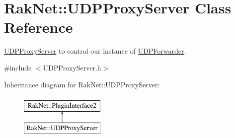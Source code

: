\hypertarget{class_rak_net_1_1_u_d_p_proxy_server}{\section{Rak\-Net\-:\-:U\-D\-P\-Proxy\-Server Class Reference}
\label{class_rak_net_1_1_u_d_p_proxy_server}
}


\hyperlink{class_rak_net_1_1_u_d_p_proxy_server}{U\-D\-P\-Proxy\-Server} to control our instance of \hyperlink{class_rak_net_1_1_u_d_p_forwarder}{U\-D\-P\-Forwarder}.  




{\ttfamily \#include $<$U\-D\-P\-Proxy\-Server.\-h$>$}

Inheritance diagram for Rak\-Net\-:\-:U\-D\-P\-Proxy\-Server\-:\begin{figure}[H]
\begin{center}
\leavevmode
\includegraphics[height=2.000000cm]{class_rak_net_1_1_u_d_p_proxy_server}
\end{center}
\end{figure}

